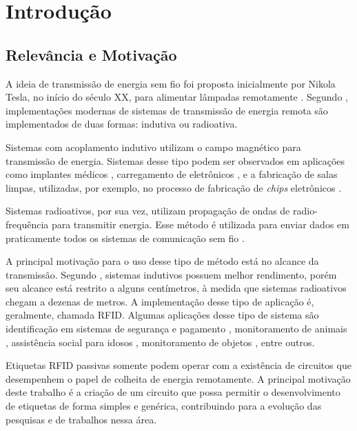 \chapter{Introdução}\label{Introducao}

\section{Relevância e Motivação}
A ideia de transmissão de energia sem fio foi proposta inicialmente por Nikola Tesla, no início do século XX, para alimentar lâmpadas remotamente \cite{TESLA:2000}. Segundo , implementações modernas de sistemas de transmissão de energia remota são implementados de duas formas: indutiva ou radioativa.

Sistemas com acoplamento indutivo utilizam o campo magnético para transmissão de energia. Sistemas desse tipo podem ser observados em aplicações como implantes médicos \cite{SCHUDER:2002}, carregamento de eletrônicos \cite{WELLS:2005}, e a fabricação de salas limpas, utilizadas, por exemplo, no processo de fabricação de \textit{chips} eletrônicos \cite{SALIMIAN:1997}.

Sistemas radioativos, por sua vez, utilizam propagação de ondas de radio-frequência para transmitir energia. Esse método é utilizada para enviar dados em praticamente todos os sistemas de comunicação sem fio \cite{YEAGER:2009}. 

A principal motivação para o uso desse tipo de método está no alcance da transmissão. Segundo , sistemas indutivos possuem melhor rendimento, porém seu alcance está restrito a alguns centímetros, à medida que sistemas radioativos chegam a dezenas de metros. A implementação desse tipo de aplicação é, geralmente, chamada RFID. Algumas aplicações desse tipo de sistema são identificação em sistemas de segurança e pagamento \cite{WEINSTEIN:2005}, monitoramento de animais \cite{YEAGER:2010}, assistência social para idosos \cite{PHILIPOSE:2004}, monitoramento de objetos \cite{RANASHINGHE:2005}, entre outros.

Etiquetas {RFID} passivas somente podem operar com a existência de circuitos que desempenhem o papel de colheita de energia remotamente. A principal motivação deste trabalho é a criação de um circuito que possa permitir o desenvolvimento de etiquetas de forma simples e genérica, contribuindo para a evolução das pesquisas e de trabalhos nessa área.


